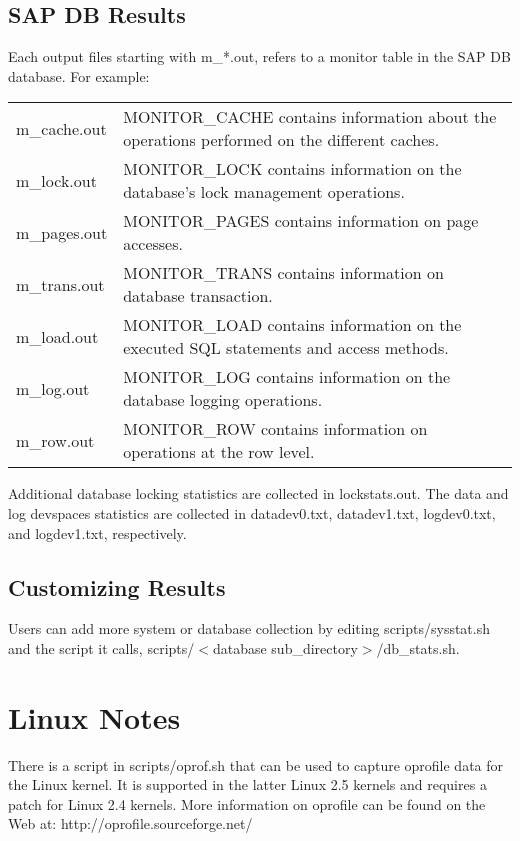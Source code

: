 \documentclass{article}
\begin{document}
\subsection{SAP DB Results}

Each output files starting with m\_*.out, refers to a monitor table in the
SAP DB database.  For example: \\
\begin{tabular}[c]{ll}
m\_cache.out & MONITOR\_CACHE contains information about the operations
               performed on the different caches. \\
m\_lock.out & MONITOR\_LOCK contains information on the database's lock
              management operations. \\
m\_pages.out & MONITOR\_PAGES contains information on page accesses. \\
m\_trans.out & MONITOR\_TRANS contains information on database transaction. \\
m\_load.out & MONITOR\_LOAD contains information on the executed SQL
              statements and access methods. \\
m\_log.out  & MONITOR\_LOG contains information on the database logging
              operations. \\
m\_row.out & MONITOR\_ROW contains information on operations at the row
             level. \\
\end{tabular}

Additional database locking statistics are collected in lockstats.out.  The
data and log devspaces statistics are collected in datadev0.txt, datadev1.txt,
logdev0.txt, and logdev1.txt, respectively.

\subsection{Customizing Results}

Users can add more system or database collection by editing scripts/sysstat.sh
and the script it calls,  scripts/$<$database sub\_directory$>$/db\_stats.sh.

\section{Linux Notes}

There is a script in scripts/oprof.sh that can be used to capture oprofile
data for the Linux kernel.  It is supported in the latter Linux 2.5 kernels
and requires a patch for Linux 2.4 kernels.  More information on oprofile can
be found on the Web at:
	http://oprofile.sourceforge.net/
\end{document}
